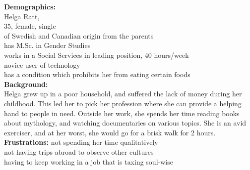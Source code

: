 \documentclass[a4paper,10pt,oneside]{scrreprt}
\begin{document}
		\begin{mdframed}
			\begin{minipage}{\textwidth}
				\begin{figure}
					\centering
					\vspace{-4cm}
				\end{figure}


				\textbf{Demographics:}\\
				Helga Ratt,\\
				35, female, single\\
				of Swedish and Canadian origin from the parents\\
				has M.Sc. in Gender Studies\\
				works in a Social Services in leading position, 40 hours/week\\
				novice user of technology\\
				has a condition which prohibits her from eating certain foods\\

				\textbf{Background:}\\
				Helga grew up in a poor household, and suffered the lack of money during her childhood. This led her to pick her profession where she can provide a helping hand to people in need. Outside her work, she spends her time reading books about mythology, and watching documentaries on various topics. She is an avid exerciser, and at her worst, she would go for a brisk walk for 2 hours.\\

				\textbf{Frustrations:}
				not spending her time qualitatively\\
				not having trips abroad to observe other cultures\\
				having to keep working in a job that is taxing soul-wise
				
			\end{minipage}
		\end{mdframed}
	
\end{document}
